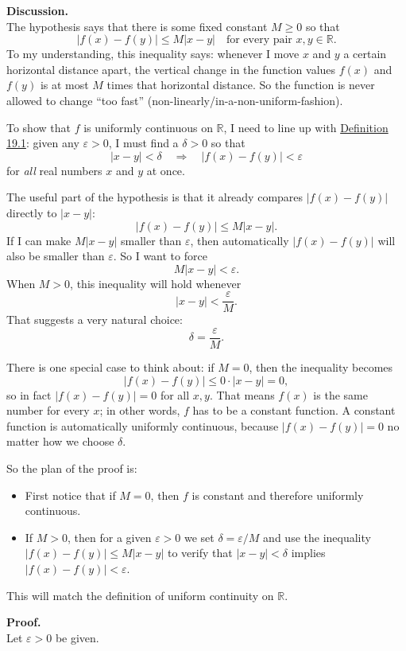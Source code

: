 \documentclass[12pt]{article}
\begin{document}
\textbf{Discussion.} \\
The hypothesis says that there is some fixed constant $M \ge 0$ so that
\[
  |f(x) - f(y)| \le M|x-y| \quad \text{for every pair } x,y \in \mathbb{R}.
\]
To my understanding, this inequality says: whenever I move $x$ and $y$ a certain horizontal distance apart, the vertical change in the function values $f(x)$ and $f(y)$ is at most $M$ times that horizontal distance. So the function is never allowed to change ``too fast'' (non-linearly/in-a-non-uniform-fashion).

To show that $f$ is uniformly continuous on $\mathbb{R}$, I need to line up with \hyperref[def:19.1]{Definition 19.1}: given any $\varepsilon > 0$, I must find a $\delta > 0$ so that
\[
  |x-y| < \delta \quad \Longrightarrow \quad |f(x) - f(y)| < \varepsilon
\]
for \emph{all} real numbers $x$ and $y$ at once.

The useful part of the hypothesis is that it already compares $|f(x)-f(y)|$ directly to $|x-y|$:
\[
  |f(x) - f(y)| \le M|x-y|.
\]
If I can make $M|x-y|$ smaller than $\varepsilon$, then automatically $|f(x)-f(y)|$ will also be smaller than $\varepsilon$.  So I want to force
\[
  M|x-y| < \varepsilon.
\]
When $M>0$, this inequality will hold whenever
\[
  |x-y| < \frac{\varepsilon}{M}.
\]
That suggests a very natural choice:
\[
  \delta = \frac{\varepsilon}{M}.
\]

There is one special case to think about: if $M = 0$, then the inequality becomes
\[
  |f(x) - f(y)| \le 0 \cdot |x-y| = 0,
\]
so in fact $|f(x) - f(y)| = 0$ for all $x,y$.  That means $f(x)$ is the same number for every $x$; in other words, $f$ has to be a constant function. A constant function is automatically uniformly continuous, because $|f(x)-f(y)| = 0$ no matter how we choose $\delta$.

So the plan of the proof is:
\begin{itemize}
  \item First notice that if $M = 0$, then $f$ is constant and therefore uniformly continuous.
  \item If $M > 0$, then for a given $\varepsilon > 0$ we set $\delta = \varepsilon/M$ and use the inequality $|f(x)-f(y)| \le M|x-y|$ to verify that $|x-y|<\delta$ implies $|f(x)-f(y)|<\varepsilon$.
\end{itemize}
This will match the definition of uniform continuity on $\mathbb{R}$.

\vspace{0.25em}

\textbf{Proof.}\\
Let $\varepsilon>0$ be given.
\end{document}
